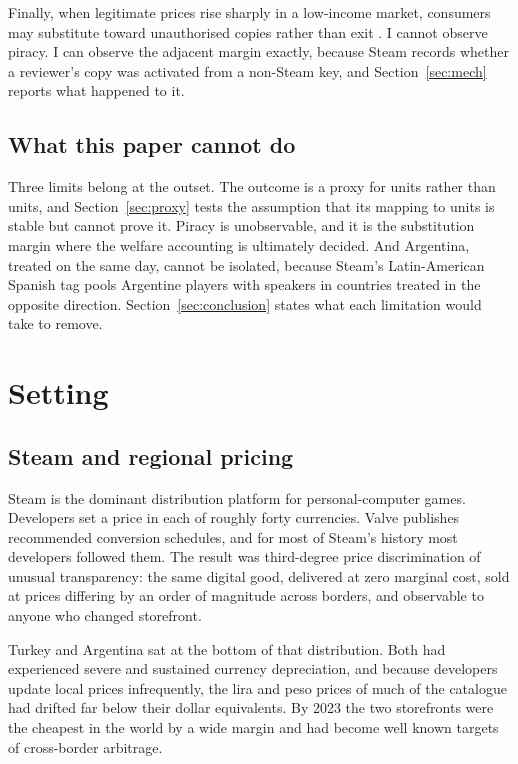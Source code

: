 \documentclass[11pt]{article}
\begin{document}
Finally, when legitimate prices rise sharply in a low-income market, consumers may substitute
toward unauthorised copies rather than exit \citep{danaher2014,danaher2010}. I cannot observe
piracy. I can observe the adjacent margin exactly, because Steam records whether a reviewer's copy
was activated from a non-Steam key, and Section~\ref{sec:mech} reports what happened to it.

\subsection*{What this paper cannot do}

Three limits belong at the outset. The outcome is a proxy for units
rather than units, and Section~\ref{sec:proxy} tests the assumption that its mapping to units is
stable but cannot prove it. Piracy is unobservable, and it is the substitution margin where the
welfare accounting is ultimately decided. And Argentina, treated on the same day, cannot be
isolated, because Steam's Latin-American Spanish tag pools Argentine players with speakers in
countries treated in the opposite direction. Section~\ref{sec:conclusion} states what each
limitation would take to remove.

\section{Setting}\label{sec:setting}

\subsection{Steam and regional pricing}

Steam is the dominant distribution platform for personal-computer games. Developers set a price in
each of roughly forty currencies. Valve publishes recommended conversion schedules, and for most
of Steam's history most developers followed them. The result was third-degree price discrimination
of unusual transparency: the same digital good, delivered at zero marginal cost, sold at prices
differing by an order of magnitude across borders, and observable to anyone who changed storefront.

Turkey and Argentina sat at the bottom of that distribution. Both had experienced severe and
sustained currency depreciation, and because developers update local prices infrequently, the lira
and peso prices of much of the catalogue had drifted far below their dollar equivalents. By 2023
the two storefronts were the cheapest in the world by a wide margin and had become well known
targets of cross-border arbitrage.
\end{document}
